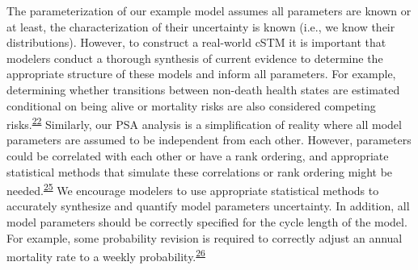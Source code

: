 \documentclass[
]{article}
\begin{document}
The parameterization of our example model assumes all parameters are known or at least, the characterization of their uncertainty is known (i.e., we know their distributions). However, to construct a real-world cSTM it is important that modelers conduct a thorough synthesis of current evidence to determine the appropriate structure of these models and inform all parameters. For example, determining whether transitions between non-death health states are estimated conditional on being alive or mortality risks are also considered competing risks.\textsuperscript{\protect\hyperlink{ref-Briggs2012}{22}} Similarly, our PSA analysis is a simplification of reality where all model parameters are assumed to be independent from each other. However, parameters could be correlated with each other or have a rank ordering, and appropriate statistical methods that simulate these correlations or rank ordering might be needed.\textsuperscript{\protect\hyperlink{ref-Goldhaber-Fiebert2015}{25}} We encourage modelers to use appropriate statistical methods to accurately synthesize and quantify model parameters uncertainty. In addition, all model parameters should be correctly specified for the cycle length of the model. For example, some probability revision is required to correctly adjust an annual mortality rate to a weekly probability.\textsuperscript{\protect\hyperlink{ref-Hunink2014}{26}}
\end{document}
